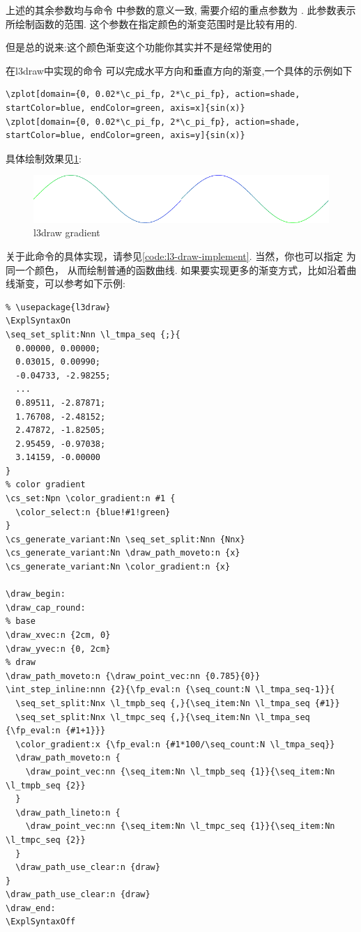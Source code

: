 上述的其余参数均与命令 \cmd{\zrule} 中参数的意义一致, 需要介绍的重点参数为 . 此参数表示所绘制函数的范围.
这个参数在指定颜色的渐变范围时是比较有用的.

\begin{remark}
但是总的说来:这个颜色渐变这个功能你其实并不是经常使用的
\end{remark}

在l3draw中实现的命令 可以完成水平方向和垂直方向的渐变,一个具体的示例如下
\begin{verbatim}
\zplot[domain={0, 0.02*\c_pi_fp, 2*\c_pi_fp}, action=shade, startColor=blue, endColor=green, axis=x]{sin(x)}
\zplot[domain={0, 0.02*\c_pi_fp, 2*\c_pi_fp}, action=shade, startColor=blue, endColor=green, axis=y]{sin(x)}
\end{verbatim}

具体绘制效果见\cref{fig:l3-gradient}:
\begin{figure}[!htb]
  \centering
  \includegraphics[width=.75\linewidth]{./pics/l3-gradient-example.pdf}
  \caption{l3draw gradient}
  \label{fig:l3-gradient}
\end{figure}

关于此命令的具体实现，请参见\cref{code:l3-draw-implement}. 当然，你也可以指定 为同一个颜色，
从而绘制普通的函数曲线. 如果要实现更多的渐变方式，比如沿着曲线渐变，可以参考如下示例:
\begin{verbatim}
% \usepackage{l3draw}
\ExplSyntaxOn
\seq_set_split:Nnn \l_tmpa_seq {;}{
  0.00000, 0.00000;
  0.03015, 0.00990;
  -0.04733, -2.98255;
  ...
  0.89511, -2.87871;
  1.76708, -2.48152;
  2.47872, -1.82505;
  2.95459, -0.97038;
  3.14159, -0.00000
}
% color gradient
\cs_set:Npn \color_gradient:n #1 {
  \color_select:n {blue!#1!green}
}
\cs_generate_variant:Nn \seq_set_split:Nnn {Nnx}
\cs_generate_variant:Nn \draw_path_moveto:n {x}
\cs_generate_variant:Nn \color_gradient:n {x}

\draw_begin:
\draw_cap_round:
% base
\draw_xvec:n {2cm, 0}
\draw_yvec:n {0, 2cm}
% draw
\draw_path_moveto:n {\draw_point_vec:nn {0.785}{0}}
\int_step_inline:nnn {2}{\fp_eval:n {\seq_count:N \l_tmpa_seq-1}}{
  \seq_set_split:Nnx \l_tmpb_seq {,}{\seq_item:Nn \l_tmpa_seq {#1}} 
  \seq_set_split:Nnx \l_tmpc_seq {,}{\seq_item:Nn \l_tmpa_seq {\fp_eval:n {#1+1}}} 
  \color_gradient:x {\fp_eval:n {#1*100/\seq_count:N \l_tmpa_seq}}
  \draw_path_moveto:n {
    \draw_point_vec:nn {\seq_item:Nn \l_tmpb_seq {1}}{\seq_item:Nn \l_tmpb_seq {2}}
  }
  \draw_path_lineto:n {
    \draw_point_vec:nn {\seq_item:Nn \l_tmpc_seq {1}}{\seq_item:Nn \l_tmpc_seq {2}}
  }
  \draw_path_use_clear:n {draw} 
}
\draw_path_use_clear:n {draw}
\draw_end:
\ExplSyntaxOff
\end{verbatim}

